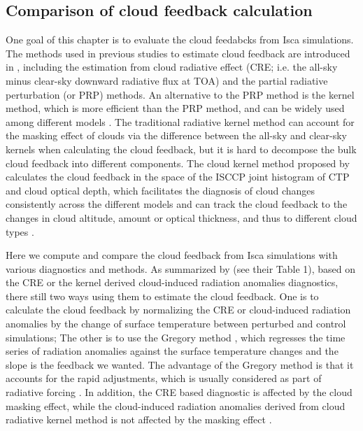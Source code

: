 
\subsection{Comparison of cloud feedback calculation}
\label{sec:cmp_cld_fbk_method_result}

One goal of this chapter is to evaluate the cloud feedabcks from Isca simulations. The methods used in previous studies to estimate cloud feedback are introduced in , including the estimation from cloud radiative effect (CRE; i.e. the all-sky minus clear-sky downward radiative flux at TOA) and the partial radiative perturbation (or PRP) methods. An alternative to the PRP method is the kernel method, which is more efficient than the PRP method, and can be widely used among different models \citep{Soden2006,Soden2008}. The traditional radiative kernel method can account for the masking effect of clouds via the difference between the all-sky and clear-sky kernels when calculating the cloud feedback, but it is hard to decompose the bulk cloud feedback into different components. The cloud kernel method proposed by \cite{Zelinka2012computing1,Zelinka2012computing2} calculates the cloud feedback in the space of the ISCCP joint histogram of CTP and cloud optical depth, which facilitates the diagnosis of cloud changes consistently across the different models and can track the cloud feedback to the changes in cloud altitude, amount or optical thickness, and thus to different cloud types \citep{Siebesma2020clouds}. 

Here we compute and compare the cloud feedback from Isca simulations with various diagnostics and methods. As summarized by \cite{Zelinka2013} (see their Table 1), based on the CRE or the kernel derived cloud-induced radiation anomalies diagnostics, there still two ways using them to estimate the cloud feedback. One is to calculate the cloud feedback by normalizing the CRE or cloud-induced radiation anomalies by the change of surface temperature between perturbed and control simulations; The other is to use the Gregory method \citep{Gregory2004}, which regresses the time series of radiation anomalies against the surface temperature changes and the slope is the feedback we wanted. The advantage of the Gregory method is that it accounts for the rapid adjustments, which is usually considered as part of radiative forcing \citep{Andrews2012cloud,Siebesma2020clouds}. In addition, the CRE based diagnostic is affected by the cloud masking effect, while the cloud-induced radiation anomalies derived from cloud radiative kernel method is not affected by the masking effect \citep{Zelinka2013}.

